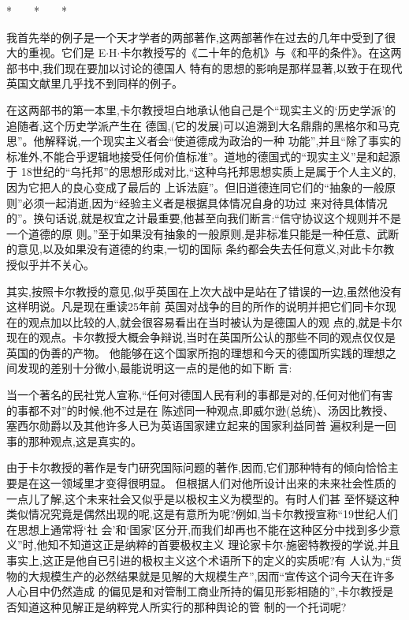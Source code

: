 ﻿\documentclass[12pt]{article}
\begin{document}
*　　*　　*

我首先举的例子是一个天才学者的两部著作,这两部著作在过去的几年中受到了很大的重视。它们是
E$\cdot$H$\cdot$卡尔教授写的《二十年的危机》与《和平的条件》。在这两部书中,我们现在要加以讨论的德国人
特有的思想的影响是那样显著,以致于在现代英国文献里几乎找不到同样的例子。

在这两部书的第一本里,卡尔教授坦白地承认他自己是个``现实主义的‘历史学派’的追随者,这个历史学派产生在
德国,(它的发展)可以追溯到大名鼎鼎的黑格尔和马克思''。他解释说,一个现实主义者会``使道德成为政治的一种
功能'',并且``除了事实的标准外,不能合乎逻辑地接受任何价值标准''。道地的德国式的``现实主义''是和起源于
18世纪的``乌托邦''的思想形成对比,``这种乌托邦思想实质上是属于个人主义的,因为它把人的良心变成了最后的
上诉法庭''。但旧道德连同它们的``抽象的一般原则''必须一起消逝,因为``经验主义者是根据具体情况自身的功过
来对待具体情况的''。换句话说,就是权宜之计最重要,他甚至向我们断言:``信守协议这个规则并不是一个道德的原
则。''至于如果没有抽象的一般原则,是非标准只能是一种任意、武断的意见,以及如果没有道德的约束,一切的国际
条约都会失去任何意义,对此卡尔教授似乎并不关心。

其实,按照卡尔教授的意见,似乎英国在上次大战中是站在了错误的一边,虽然他没有这样明说。凡是现在重读25年前
英国对战争的目的所作的说明并把它们同卡尔现在的观点加以比较的人,就会很容易看出在当时被认为是德国人的观
点的,就是卡尔现在的观点。卡尔教授大概会争辩说,当时在英国所公认的那些不同的观点仅仅是英国的伪善的产物。
他能够在这个国家所抱的理想和今天的德国所实践的理想之间发现的差别十分微小,最能说明这一点的是他的如下断
言:

当一个著名的民社党人宣称,``任何对德国人民有利的事都是对的,任何对他们有害的事都不对''的时候,他不过是在
陈述同一种观点,即威尔逊(总统)、汤因比教授、塞西尔勋爵以及其他许多人已为英语国家建立起来的国家利益同普
遍权利是一回事的那种观点,这是真实的。

由于卡尔教授的著作是专门研究国际问题的著作,因而,它们那种特有的倾向恰恰主要是在这一领域里才变得很明显。
但根据人们对他所设计出来的未来社会性质的一点儿了解,这个未来社会又似乎是以极权主义为模型的。有时人们甚
至怀疑这种类似情况究竟是偶然出现的呢,这是有意所为呢?例如,当卡尔教授宣称``19世纪人们在思想上通常将‘社
会’和‘国家’区分开,而我们却再也不能在这种区分中找到多少意义''时,他知不知道这正是纳粹的首要极权主义
理论家卡尔$\cdot$施密特教授的学说,并且事实上,这正是他自已引进的极权主义这个术语所下的定义的实质呢?有
人认为,``货物的大规模生产的必然结果就是见解的大规模生产'',因而``宣传这个词今天在许多人心目中仍然造成
的偏见是和对管制工商业所持的偏见形影相随的'',卡尔教授是否知道这种见解正是纳粹党人所实行的那种舆论的管
制的一个托词呢?
\end{document}
